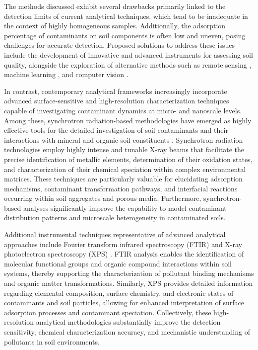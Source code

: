 \documentclass[sn-mathphys-num]{sn-jnl}
\begin{document}
The methods discussed exhibit several drawbacks primarily linked to the
detection limits of current analytical techniques, which tend to be inadequate
in the context of highly homogeneous samples. Additionally, the adsorption
percentage of contaminants on soil components is often low and uneven, posing
challenges for accurate detection. Proposed solutions to address these issues
include the development of innovative and advanced instruments for assessing
soil quality, alongside the exploration of alternative methods such as remote
sensing \cite{Fan2025,Lemenkova2025b}, machine learning
\cite{Proshad2025,Lemenkova2025d,Lemenkova2024b}, and computer vision
\cite{Fengetal2024}.

In contrast, contemporary analytical frameworks increasingly incorporate
advanced surface-sensitive and high-resolution characterization techniques
capable of investigating contaminant dynamics at micro- and nanoscale levels.
Among these, synchrotron radiation-based methodologies have emerged as highly
effective tools for the detailed investigation of soil contaminants and their
interactions with mineral and organic soil constituents
\cite{Hu2020,Rosskopfova2012,LindhLemenkova2023a}. Synchrotron radiation
technologies employ highly intense and tunable X-ray beams that facilitate
the precise identification of metallic elements, determination of their
oxidation states, and characterization of their chemical speciation within
complex environmental matrices. These techniques are particularly valuable for
elucidating adsorption mechanisms, contaminant transformation pathways, and
interfacial reactions occurring within soil aggregates and porous media.
Furthermore, synchrotron-based analyses significantly improve the capability
to model contaminant distribution patterns and microscale heterogeneity in
contaminated soils.

Additional instrumental techniques representative of advanced analytical
approaches include Fourier transform infrared spectroscopy (FTIR)
\cite{Xu2026} and X-ray photoelectron spectroscopy (XPS)
\cite{Guo2025,LindhLemenkova2023c}. FTIR analysis enables the identification
of molecular functional groups and organic compound interactions within soil
systems, thereby supporting the characterization of pollutant binding
mechanisms and organic matter transformations. Similarly, XPS provides
detailed information regarding elemental composition, surface chemistry, and
electronic states of contaminants and soil particles, allowing for enhanced
interpretation of surface adsorption processes and contaminant speciation.
Collectively, these high-resolution analytical methodologies substantially
improve the detection sensitivity, chemical characterization accuracy, and
mechanistic understanding of pollutants in soil environments.
\end{document}
